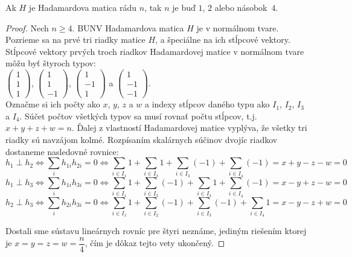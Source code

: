 \begin{theorem}
\label{th:hadam_4}
Ak $H$ je Hadamardova matica rádu $n$, tak $n$ je buď $1$, $2$ alebo násobok~$4$. 
\end{theorem}
\begin{proof}
Nech $n \geq 4$.
BUNV Hadamardova matica $H$ je v normálnom tvare.  
Pozrieme sa na prvé tri riadky matice $H$, a špeciálne na ich stĺpcové vektory.
Stĺpcové vektory prvých troch riadkov Hadamardovej matice v normálnom tvare môžu byť štyroch typov:\\ $\begin{pmatrix}1\\1\\1\end{pmatrix}$, 
$\begin{pmatrix}1\\1\\-1\end{pmatrix}$, 
$\begin{pmatrix}1\\-1\\1\end{pmatrix}$
a
$\begin{pmatrix}1\\-1\\-1\end{pmatrix}$.\\
Označme si ich počty ako $x$, $y$, $z$ a $w$ a indexy stĺpcov daného typu ako $I_1$, $I_2$, $I_3$ a  $I_4$. Súčet počtov všetkých typov sa musí rovnať počtu stĺpcov, t.j. $x + y + z + w = n$. Ďalej z vlastností Hadamardovej matice vyplýva, že všetky tri riadky sú navzájom kolmé.
Rozpísaním skalárnych súčinov dvojíc riadkov dostaneme nasledovné rovnice:
$$ h_1 \perp h_2 \Longleftrightarrow \sum_i h_{1 i} h_{2 i} = 0 \Longleftrightarrow \sum_{i \in I_1} 1 + \sum_{i \in I_2}1 + \sum_{i \in I_3}(-1) + \sum_{i \in I_4} (-1) = x + y - z - w = 0 $$ 
$$ h_1 \perp h_3 \Longleftrightarrow \sum_i h_{1 i} h_{3 i} = 0 \Longleftrightarrow \sum_{i \in I_1} 1 + \sum_{i \in I_2}(-1) + \sum_{i \in I_3}1 + \sum_{i \in I_4} (-1) = x - y + z - w = 0 $$ 
$$ h_2 \perp h_3 \Longleftrightarrow \sum_i h_{2 i} h_{3 i} = 0 \Longleftrightarrow \sum_{i \in I_1} 1 + \sum_{i \in I_2}(-1) + \sum_{i \in I_3}(-1) + \sum_{i \in I_4} 1 = x - y - z + w = 0 $$ 

Dostali sme sústavu lineárnych rovníc pre štyri neznáme, jediným riešením ktorej je $x = y = z = w = \dfrac{n}{4}$, čím je dôkaz tejto vety ukončený.
\end{proof}

